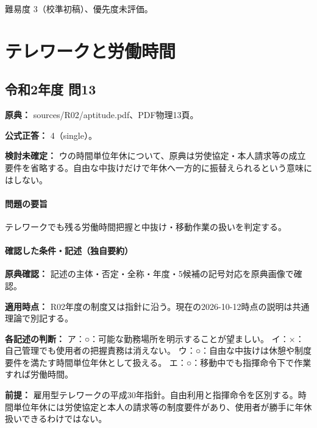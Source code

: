 \par 難易度 3（校準初稿）、優先度未評価。

\section{テレワークと労働時間}

\subsection{令和2年度 問13}
\label{q:r02-reg-apt-13}

\noindent\textbf{原典：} sources/R02/aptitude.pdf、PDF物理13頁。

\textbf{公式正答：} 4（single）。

\par\textbf{検討未確定：} ウの時間単位年休について、原典は労使協定・本人請求等の成立要件を省略する。自由な中抜けだけで年休へ一方的に振替えられるという意味にはしない。

\paragraph{問題の要旨} テレワークでも残る労働時間把握と中抜け・移動作業の扱いを判定する。

\paragraph{確認した条件・記述（独自要約）}\mbox{}\par

\noindent\textbf{原典確認：} 記述の主体・否定・全称・年度・5候補の記号対応を原典画像で確認。\par

\noindent\textbf{適用時点：} R02年度の制度又は指針に沿う。現在の2026-10-12時点の説明は共通理論で別記する。\par

\noindent\textbf{各記述の判断：} ア：○：可能な勤務場所を明示することが望ましい。 イ：×：自己管理でも使用者の把握責務は消えない。 ウ：○：自由な中抜けは休憩や制度要件を満たす時間単位年休として扱える。 エ：○：移動中でも指揮命令下で作業すれば労働時間。\par

\noindent\textbf{前提：} 雇用型テレワークの平成30年指針。自由利用と指揮命令を区別する。時間単位年休には労使協定と本人の請求等の制度要件があり、使用者が勝手に年休扱いできるわけではない。\par

